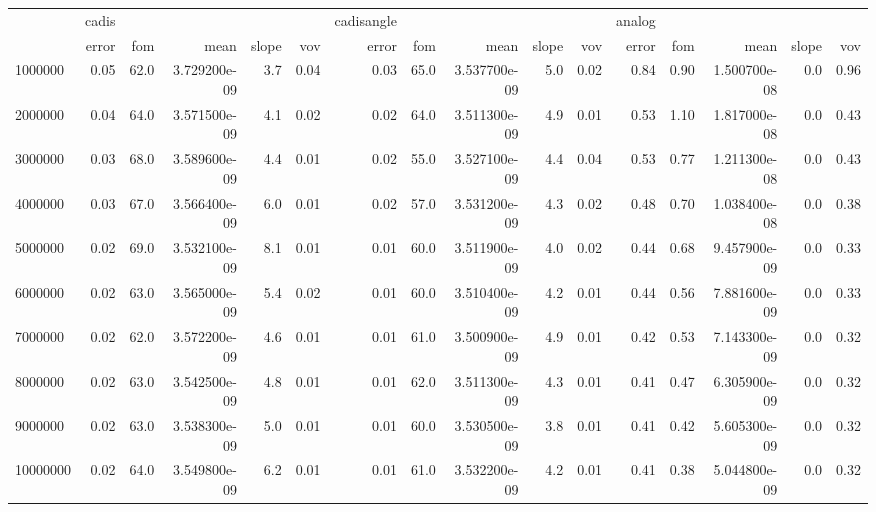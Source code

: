 \begin{tabular}{lrrrrrrrrrrrrrrr}
\toprule
{} & cadis &      &               &       &      & cadisangle &      &               &       &      & analog &      &               &       &      \\
{} & error &  fom &          mean & slope &  vov &      error &  fom &          mean & slope &  vov &  error &  fom &          mean & slope &  vov \\
\midrule
1000000  &  0.05 & 62.0 &  3.729200e-09 &   3.7 & 0.04 &       0.03 & 65.0 &  3.537700e-09 &   5.0 & 0.02 &   0.84 & 0.90 &  1.500700e-08 &   0.0 & 0.96 \\
2000000  &  0.04 & 64.0 &  3.571500e-09 &   4.1 & 0.02 &       0.02 & 64.0 &  3.511300e-09 &   4.9 & 0.01 &   0.53 & 1.10 &  1.817000e-08 &   0.0 & 0.43 \\
3000000  &  0.03 & 68.0 &  3.589600e-09 &   4.4 & 0.01 &       0.02 & 55.0 &  3.527100e-09 &   4.4 & 0.04 &   0.53 & 0.77 &  1.211300e-08 &   0.0 & 0.43 \\
4000000  &  0.03 & 67.0 &  3.566400e-09 &   6.0 & 0.01 &       0.02 & 57.0 &  3.531200e-09 &   4.3 & 0.02 &   0.48 & 0.70 &  1.038400e-08 &   0.0 & 0.38 \\
5000000  &  0.02 & 69.0 &  3.532100e-09 &   8.1 & 0.01 &       0.01 & 60.0 &  3.511900e-09 &   4.0 & 0.02 &   0.44 & 0.68 &  9.457900e-09 &   0.0 & 0.33 \\
6000000  &  0.02 & 63.0 &  3.565000e-09 &   5.4 & 0.02 &       0.01 & 60.0 &  3.510400e-09 &   4.2 & 0.01 &   0.44 & 0.56 &  7.881600e-09 &   0.0 & 0.33 \\
7000000  &  0.02 & 62.0 &  3.572200e-09 &   4.6 & 0.01 &       0.01 & 61.0 &  3.500900e-09 &   4.9 & 0.01 &   0.42 & 0.53 &  7.143300e-09 &   0.0 & 0.32 \\
8000000  &  0.02 & 63.0 &  3.542500e-09 &   4.8 & 0.01 &       0.01 & 62.0 &  3.511300e-09 &   4.3 & 0.01 &   0.41 & 0.47 &  6.305900e-09 &   0.0 & 0.32 \\
9000000  &  0.02 & 63.0 &  3.538300e-09 &   5.0 & 0.01 &       0.01 & 60.0 &  3.530500e-09 &   3.8 & 0.01 &   0.41 & 0.42 &  5.605300e-09 &   0.0 & 0.32 \\
10000000 &  0.02 & 64.0 &  3.549800e-09 &   6.2 & 0.01 &       0.01 & 61.0 &  3.532200e-09 &   4.2 & 0.01 &   0.41 & 0.38 &  5.044800e-09 &   0.0 & 0.32 \\
\bottomrule
\end{tabular}

